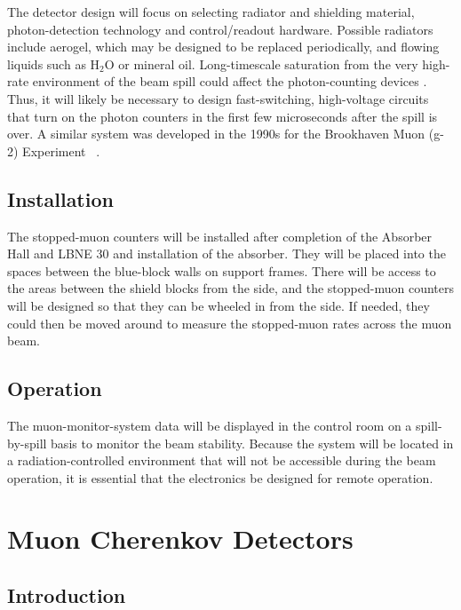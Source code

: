 The detector design will focus on selecting radiator and shielding
material, photon-detection technology and control/readout
hardware. Possible radiators include aerogel, which may be designed to
be replaced periodically, and flowing liquids such as H$_2$O or
mineral oil. Long-timescale saturation from the very high-rate
environment of the beam spill could affect the photon-counting devices
\cite{ref:HighRateCounting}. Thus, it will likely be necessary to
design fast-switching, high-voltage circuits that turn on the photon
counters in the first few microseconds after the spill is over. A
similar system was developed in the 1990s for the Brookhaven Muon
(g-2) Experiment~\cite{ref:G2} .

\subsection{Installation}

The stopped-muon counters will be installed after completion of the 
Absorber Hall and LBNE 30  
and installation of the absorber. 
They will be placed into the spaces between the blue-block walls on
support frames.   There will be access to the areas between the shield blocks 
from the side, and the stopped-muon counters will be designed so that they can 
be wheeled in from the side.  If needed, they could then be moved around to measure
the stopped-muon rates across the muon beam.

\subsection{Operation}

The muon-monitor-system data will be displayed in the control room on
a spill-by-spill basis to monitor the beam stability. Because the
system will be located in a radiation-controlled environment that will
not be accessible during the beam operation, it is essential that the
electronics be designed for remote operation.

%
%
\section{Muon Cherenkov Detectors} %
\label{v3ch3-mu-ch-det}
\subsection{Introduction}

